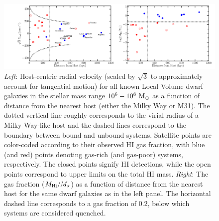 \documentclass[usenatbib]{mnras}
\newcommand{\mstar}{{M}_{\star}}
\newcommand{\msun}{{\rm M}_{\odot}}
\begin{document}
\begin{figure}
 \centering
 \hspace*{-0.3in}
 \includegraphics[width=7.2in]{fig1.pdf}
 \caption{{\it Left}: Host-centric radial velocity (scaled by
   $\sqrt{3}$ to approximately account for tangential motion) for all
   known Local Volume dwarf galaxies in the stellar mass range
   $10^{6}-10^{8}~\msun$ as a function of distance from the nearest
   host (either the Milky Way or M31). The dotted vertical line
   roughly corresponds to the virial radius of a Milky Way-like host
   and the dashed lines correspond to the boundary between bound and
   unbound systems. Satellite points are color-coded according to
   their observed H{\scriptsize I} gas fraction, with blue (and red)
   points denoting gas-rich (and gas-poor) systems, respectively. 
   The closed points signify H{\scriptsize I} detections, while the
   open points correspond to upper limits on the 
   total H{\scriptsize I} mass. {\it Right}: The gas fraction
   ($M_{\rm H\protect\scalebox{0.55}{\rm I}}/\mstar$) as a function of distance
   from the nearest host for the same dwarf galaxies as in the left
   panel. The horizontal dashed line corresponds to a gas fraction of
   $0.2$, below which systems are considered quenched.}
 \label{fig:LVdwarfs}
\end{figure}

\end{document}
